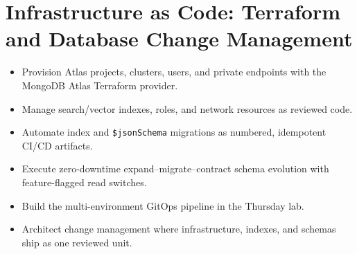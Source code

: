 \chapter{Infrastructure as Code: Terraform and Database Change Management}
%

\begin{objectives}
\begin{itemize}
    \item Provision Atlas projects, clusters, users, and private endpoints with the MongoDB Atlas Terraform provider.
    \item Manage search/vector indexes, roles, and network resources as reviewed code.
    \item Automate index and \texttt{\$jsonSchema} migrations as numbered, idempotent CI/CD artifacts.
    \item Execute zero-downtime expand--migrate--contract schema evolution with feature-flagged read switches.
    \item Build the multi-environment GitOps pipeline in the Thursday lab.
    \item Architect change management where infrastructure, indexes, and schemas ship as one reviewed unit.
\end{itemize}
\end{objectives}

